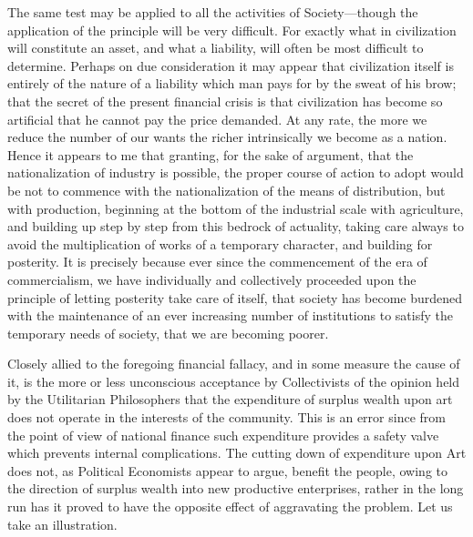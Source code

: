 \documentclass{book}
\begin{document}
The same test may be applied to all the activities of Society—though the application of the principle will be very difficult. For exactly what in civilization will constitute an asset, and what a liability, will often be most difficult to determine. Perhaps on due consideration it may appear that civilization itself is entirely of the nature of a liability which man pays for by the sweat of his brow; that the secret of the present financial crisis is that civilization has become so artificial that he cannot pay the price demanded. At any rate, the more we reduce the number of our wants the richer intrinsically we become as a nation. Hence it appears to me that granting, for the sake of argument, that the nationalization of industry is possible, the proper course of action to adopt would be not to commence with the nationalization of the means of distribution, but with production, beginning at the bottom of the industrial scale with agriculture, and building up step by step from this bedrock of actuality, taking care always to avoid the multiplication of works of a temporary character, and building for posterity. It is precisely because ever since the commencement of the era of commercialism, we have individually and collectively proceeded upon the principle of letting posterity take care of itself, that society has become burdened with the maintenance of an ever increasing number of institutions to satisfy the temporary needs of society, that we are becoming poorer.\footnotemark[5]

Closely allied to the foregoing financial fallacy, and in some measure the cause of it, is the more or less unconscious acceptance by Collectivists of the opinion held by the Utilitarian Philosophers that the expenditure of surplus wealth upon art does not operate in the interests of the community. This is an error since from the point of view of national finance such expenditure provides a safety valve which prevents internal complications. The cutting down of expenditure upon Art does not, as Political Economists appear to argue, benefit the people, owing to the direction of surplus wealth into new productive enterprises, rather in the long run has it proved to have the opposite effect of aggravating the problem. Let us take an illustration.
\end{document}

